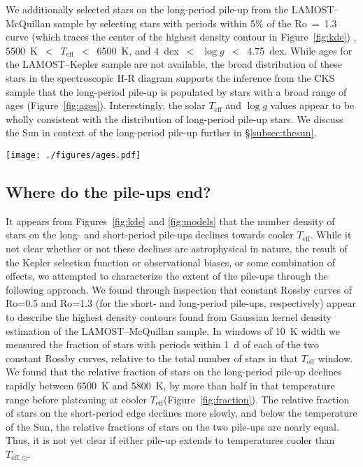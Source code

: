 \documentclass[linenumbers,tighten,trackchanges,twocolumn]{aastex631}
\newcommand{\lamostkep}{LAMOST--Kepler\xspace}
\newcommand{\lamostmcq}{LAMOST--McQuillan\xspace}
\newcommand{\teff}{\ensuremath{T_{\mathrm{eff}}}\xspace}
\newcommand{\logg}{\ensuremath{\log g}\xspace}
\newcommand{\tsun}{$T_\mathrm{eff,\odot}$\xspace}
\begin{document}
We additionally selected stars on the long-period pile-up from the \lamostmcq sample by selecting stars with periods within 5\% of the Ro~=~1.3 curve (which traces the center of the highest density contour in Figure~\ref{fig:kde}) , 5500~K~$<$~\teff~$<$~6500~K, and 4~dex~$<$~\logg~$<$~4.75~dex. While ages for the \lamostkep sample are not available, the broad distribution of these stars in the spectroscopic H-R diagram supports the inference from the CKS sample that the long-period pile-up is populated by stars with a broad range of ages (Figure~\ref{fig:ages}). Interestingly, the solar \teff and \logg values appear to be wholly consistent with the distribution of long-period pile-up stars. We discuss the Sun in context of the long-period pile-up further in \S\ref{subsec:thesun}.

\begin{figure*}
    \centering
    \texttt{[image: ./figures/ages.pdf]}
    \caption{Above, H-R diagram placement of long-period pile-up stars relative to the Sun and the CKS sample (a) and similarly for the LAMOST--Kepler sample (b). Below, the \teff-age plane for CKS stars along the long-period pile-up using isochrone ages from the CKS (c) and SPOCS (d) catalogs.}
    \label{fig:ages}
\end{figure*}

\subsection{Where do the pile-ups end?} \label{subsec:extent}
It appears from Figures~\ref{fig:kde} and \ref{fig:models} that the number density of stars on the long- and short-period pile-ups declines towards cooler \teff. While it not clear whether or not these declines are astrophysical in nature, the result of the Kepler selection function or observational biases, or some combination of effects, we attempted to characterize the extent of the pile-ups through the following approach. We found through inspection that constant Rossby curves of Ro=0.5 and Ro=1.3 (for the short- and long-period pile-ups, respectively) appear to describe the highest density contours found from Gaussian kernel density estimation of the \lamostmcq sample. In windows of 10~K width we measured the fraction of stars with periods within 1~d of each of the two constant Rossby curves, relative to the total number of stars in that \teff window. We found that the relative fraction of stars on the long-period pile-up declines rapidly between 6500~K and 5800~K, by more than half in that temperature range before plateauing at cooler \teff (Figure~\ref{fig:fraction}). The relative fraction of stars on the short-period edge declines more slowly, and below the temperature of the Sun, the relative fractions of stars on the two pile-ups are nearly equal. Thus, it is not yet clear if either pile-up extends to temperatures cooler than \tsun.
\end{document}
